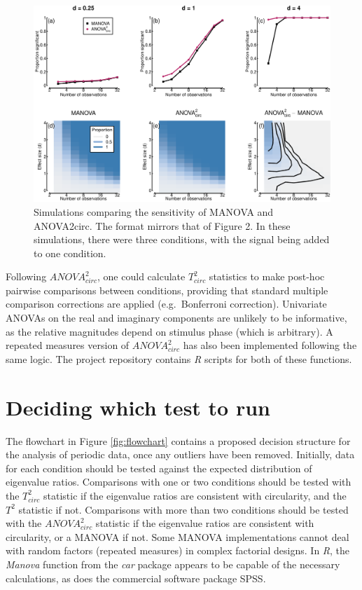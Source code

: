 \documentclass[]{article}
\begin{document}
\begin{figure}

{\centering \includegraphics{manuscript_files/figure-latex/powerfig2-1} 

}

\caption{Simulations comparing the sensitivity of MANOVA and ANOVA2circ. The format mirrors that of Figure 2. In these simulations, there were three conditions, with the signal being added to one condition.}\label{fig:powerfig2}
\end{figure}

Following \({ANOVA}^2_{circ}\), one could calculate \(T^2_{circ}\) statistics to make post-hoc pairwise comparisons between conditions, providing that standard multiple comparison corrections are applied (e.g.~Bonferroni correction). Univariate ANOVAs on the real and imaginary components are unlikely to be informative, as the relative magnitudes depend on stimulus phase (which is arbitrary). A repeated measures version of \({ANOVA}^2_{circ}\) has also been implemented following the same logic. The project repository contains \emph{R} scripts for both of these functions.

\hypertarget{deciding-which-test-to-run}{%
\section{Deciding which test to run}\label{deciding-which-test-to-run}}

The flowchart in Figure \ref{fig:flowchart} contains a proposed decision structure for the analysis of periodic data, once any outliers have been removed. Initially, data for each condition should be tested against the expected distribution of eigenvalue ratios. Comparisons with one or two conditions should be tested with the \(T^2_{circ}\) statistic if the eigenvalue ratios are consistent with circularity, and the \(T^2\) statistic if not. Comparisons with more than two conditions should be tested with the \(ANOVA^2_{circ}\) statistic if the eigenvalue ratios are consistent with circularity, or a MANOVA if not. Some MANOVA implementations cannot deal with random factors (repeated measures) in complex factorial designs. In \emph{R}, the \emph{Manova} function from the \emph{car} package appears to be capable of the necessary calculations, as does the commercial software package SPSS.
\end{document}
